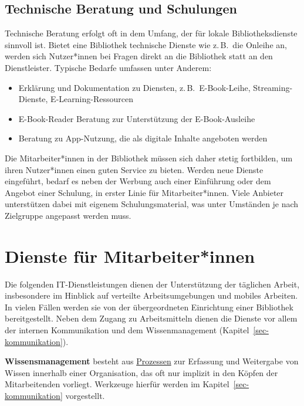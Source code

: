 \documentclass[
  11pt,
  letterpaper,
  DIV=11,
  twoside]{scrreprt}
\begin{document}
\subsection{Technische Beratung und
Schulungen}\label{technische-beratung-und-schulungen}

Technische Beratung erfolgt oft in dem Umfang, der für lokale
Bibliotheksdienste sinnvoll ist. Bietet eine Bibliothek technische
Dienste wie z.\,B.~die Onleihe an, werden sich Nutzer*innen bei Fragen
direkt an die Bibliothek statt an den Dienstleister. Typische Bedarfe
umfassen unter Anderem:

\begin{itemize}
\item
  Erklärung und Dokumentation zu Diensten, z.\,B.~E-Book-Leihe,
  Streaming-Dienste, E-Learning-Ressourcen
\item
  E-Book-Reader Beratung zur Unterstützung der E-Book-Ausleihe
\item
  Beratung zu App-Nutzung, die als digitale Inhalte angeboten werden
\end{itemize}

Die Mitarbeiter*innen in der Bibliothek müssen sich daher stetig
fortbilden, um ihren Nutzer*innen einen guten Service zu bieten. Werden
neue Dienste eingeführt, bedarf es neben der Werbung auch einer
Einführung oder dem Angebot einer Schulung, in erster Linie für
Mitarbeiter*innen. Viele Anbieter unterstützen dabei mit eigenem
Schulungsmaterial, was unter Umständen je nach Zielgruppe angepasst
werden muss.

\section{Dienste für
Mitarbeiter*innen}\label{dienste-fuxfcr-mitarbeiterinnen}

Die folgenden IT-Dienstleistungen dienen der Unterstützung der täglichen
Arbeit, insbesondere im Hinblick auf verteilte Arbeitsumgebungen und
mobiles Arbeiten. In vielen Fällen werden sie von der übergeordneten
Einrichtung einer Bibliothek bereitgestellt. Neben dem Zugang zu
Arbeitsmitteln dienen die Dienste vor allem der internen Kommunikation
und dem Wissenmanagement (Kapitel~\ref{sec-kommunikation}).

\begin{tcolorbox}[enhanced jigsaw, leftrule=.75mm, toprule=.15mm, left=2mm, opacityback=0, arc=.35mm, colback=white, breakable, colframe=quarto-callout-important-color-frame, rightrule=.15mm, bottomrule=.15mm]
\begin{minipage}[t]{5.5mm}
\textcolor{quarto-callout-important-color}{\faExclamation}
\end{minipage}%
\begin{minipage}[t]{\textwidth - 5.5mm}

\textbf{Wissensmanagement} besteht aus
\hyperref[wissensmanagement]{Prozessen} zur Erfassung und Weitergabe von
Wissen innerhalb einer Organisation, das oft nur implizit in den Köpfen
der Mitarbeitenden vorliegt. Werkzeuge hierfür werden im
Kapitel~\ref{sec-kommunikation} vorgestellt.

\end{minipage}%
\end{tcolorbox}
\end{document}
